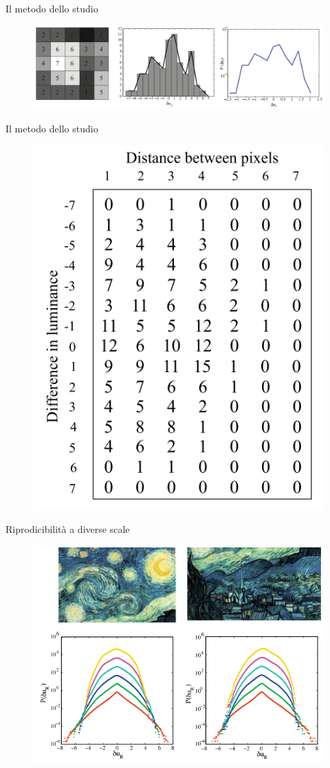 \documentclass[11pt]{beamer}
\begin{document}
\begin{frame}{Il metodo dello studio}
\begin{figure}
\centering
\includegraphics[scale=0.22]{studio1.png}
\end{figure}
\end{frame}

\begin{frame}{Il metodo dello studio}
\begin{figure}
\centering
\includegraphics[scale=0.27]{studio2.png}
\end{figure}
\end{frame}

\begin{frame}{Riprodicibilità a diverse scale}
\begin{figure}
\centering
\includegraphics[scale=0.43]{studio3.png}
\end{figure}
\end{frame}
\end{document}
